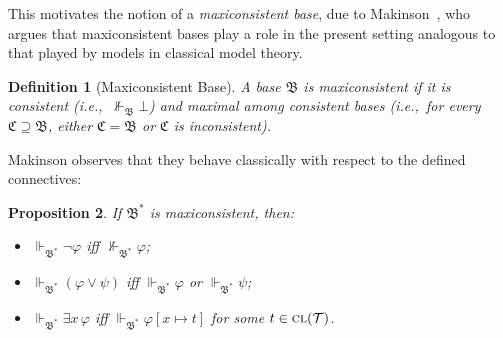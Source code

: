 \documentclass[reqno]{asl}
\newtheorem{definition}{Definition}
\newtheorem{proposition}[definition]{Proposition}
\newcommand{\setTerm}{\mathcal{T}}
\newcommand{\closure}{\textsc{cl}}
\newcommand{\setClosedTerm}{\closure(\setTerm)}
\newcommand{\supp}{\Vdash}
\newcommand{\base}[1]{\mathfrak{#1}}
\newcommand{\mbase}[1]{{\mathfrak{#1}^\ast}}
\begin{document}
This motivates the notion of a \emph{maxiconsistent base}, due to 
Makinson~\cite{Makinson_2014}, who argues that maxiconsistent bases 
play a role in the present setting analogous to that played by models 
in classical model theory. 

\begin{definition}[Maxiconsistent Base]
A base $\base{B}$ is \emph{maxiconsistent} if it is consistent 
(i.e.,~$\not\supp_{\base{B}} \bot$) and maximal among consistent 
bases (i.e.,~for every $\base{C} \supseteq \base{B}$, either 
$\base{C} = \base{B}$ or $\base{C}$ is inconsistent).
\end{definition}

Makinson observes that they behave classically with respect to the defined 
connectives:

\begin{proposition}\label{prop:maxiconsistent-disjunction}
If $\mbase{B}$ is maxiconsistent, then:
\begin{itemize}
    \item $\supp_{\mbase{B}} \neg \varphi$ iff $\not\supp_{\mbase{B}} \varphi$;
    \item $\supp_{\mbase{B}} (\varphi \lor \psi)$ iff $\supp_{\mbase{B}} \varphi$
        or $\supp_{\mbase{B}} \psi$;
    \item $\supp_{\mbase{B}} \exists x\,\varphi$ iff $\supp_{\mbase{B}}
        \varphi[x \mapsto t]$ for some $t \in \setClosedTerm$.
\end{itemize}
\end{proposition}
\end{document}
